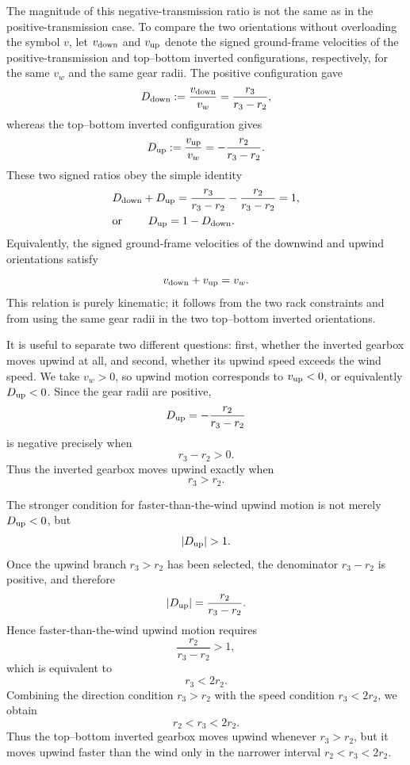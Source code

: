 \documentclass[a4paper]{article}
\begin{document}
The magnitude of this negative-transmission ratio is not the same as in the
positive-transmission case.  To compare the two orientations without
overloading the symbol \(v\), let \(v_{\rm down}\) and \(v_{\rm up}\) denote
the signed ground-frame velocities of the positive-transmission and
top--bottom inverted configurations, respectively, for the same \(v_w\) and
the same gear radii.  The positive configuration gave
\[
D_{\rm down}
:=
\frac{v_{\rm down}}{v_w}
=
\frac{r_3}{r_3-r_2},
\]
whereas the top--bottom inverted configuration gives
\[
D_{\rm up}
:=
\frac{v_{\rm up}}{v_w}
=
-\frac{r_2}{r_3-r_2}.
\]
These two signed ratios obey the simple identity
\begin{align}
&D_{\rm down} + D_{\rm up}
=
\frac{r_3}{r_3-r_2}
-
\frac{r_2}{r_3-r_2}
=1,
\nonumber\\
&\text{or }\qquad
D_{\rm up}=1-D_{\rm down}.
\label{eq:upwind-downwind-symmetry}
\end{align}
Equivalently, the signed ground-frame velocities of the downwind and upwind
orientations satisfy
\[
v_{\rm down}+v_{\rm up}=v_w .
\]
This relation is purely kinematic; it follows from the two rack constraints
and from using the same gear radii in the two top--bottom inverted
orientations.

It is useful to separate two different questions: first, whether the inverted
gearbox moves upwind at all, and second, whether its upwind speed exceeds the
wind speed.  We take \(v_w>0\), so upwind motion corresponds to \(v_{\rm up}<0\), or
equivalently \(D_{\rm up}<0\).  Since the gear radii are positive,
\[
D_{\rm up}
=
-\frac{r_2}{r_3-r_2}
\]
is negative precisely when
\[
r_3-r_2>0.
\]
Thus the inverted gearbox moves upwind exactly when
\[
r_3>r_2 .
\]

The stronger condition for faster-than-the-wind upwind motion is not merely
\(D_{\rm up}<0\), but
\[
|D_{\rm up}|>1 .
\]
Once the upwind branch \(r_3>r_2\) has been selected, the denominator
\(r_3-r_2\) is positive, and therefore
\[
|D_{\rm up}|
=
\frac{r_2}{r_3-r_2}.
\]
Hence faster-than-the-wind upwind motion requires
\[
\frac{r_2}{r_3-r_2}>1,
\]
which is equivalent to
\[
r_3<2r_2 .
\]
Combining the direction condition \(r_3>r_2\) with the speed condition
\(r_3<2r_2\), we obtain
\begin{equation}
r_2<r_3<2r_2 .
\label{eq:upwind-amplification-condition}
\end{equation}
Thus the top--bottom inverted gearbox moves upwind whenever \(r_3>r_2\), but
it moves upwind faster than the wind only in the narrower interval
\(r_2<r_3<2r_2\).
\end{document}
